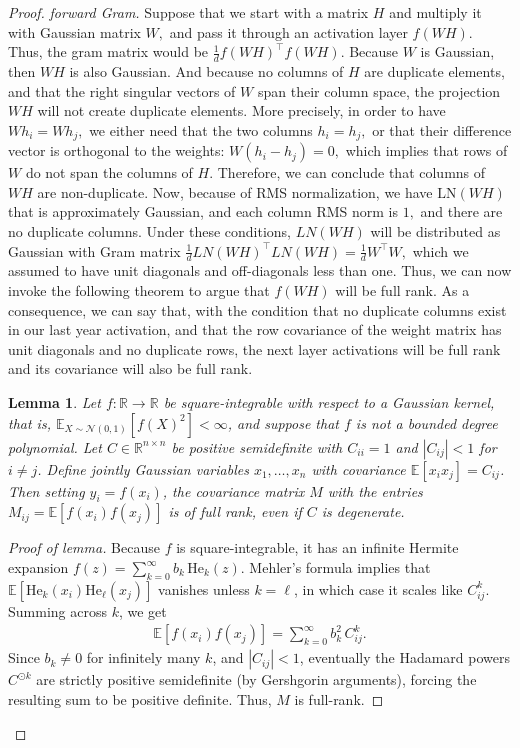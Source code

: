 \documentclass[11pt]{article}
\newcommand{\He}{\mathrm{He}}
\newtheorem{lemma}{Lemma}[section]
\begin{document}
\begin{proof}
\textit{forward Gram.} Suppose that we start with a matrix $H$ and multiply it with Gaussian matrix $W,$ and pass it through an activation layer $f( W H).$ Thus, the gram matrix would be $\frac1d f(WH)^\top f(WH).$ Because $W$ is Gaussian, then $W H$ is also Gaussian. And because no columns of $H$ are duplicate elements, and that the right singular vectors of $W$ span their column space, the projection $W H $ will not create duplicate elements. More precisely, in order to have $Wh_i = W h_j,$ we either need that the two columns $h_i= h_j,$ or that their difference vector is orthogonal to the weights: $W (h_i - h_j ) = 0,$ which implies that rows of $W$ do not span the columns of $H.$ Therefore, we can conclude that columns of $WH $ are non-duplicate. Now, because of RMS normalization, we have $\text{LN}(W H)$ that is approximately Gaussian, and each column RMS norm is $1,$ and there are no duplicate columns. Under these conditions, $LN(WH)$ will be distributed as Gaussian with Gram matrix $\frac1d LN(WH)^\top LN(WH) = \frac1d W^\top W,$ which we assumed to have unit diagonals and off-diagonals less than one. Thus, we can now invoke the following theorem to argue that $f(WH)$ will be full rank. As a consequence, we can say that, with the condition that no duplicate columns exist in our last year activation, and that the row covariance of the weight matrix has unit diagonals and no duplicate rows, the next layer activations will be full rank and its covariance will also be full rank. 

\begin{lemma}
\label{prop:RankPreservation}
Let $ f: \mathbb{R} \to \mathbb{R}$ be square-integrable with respect to a Gaussian kernel, that is, $\mathbb{E}_{X\sim \mathcal{N}(0,1)}[f(X)^2] < \infty$, and suppose that $f$ is not a bounded degree polynomial. Let $C\in \mathbb{R}^{n\times n}$ be positive semidefinite with $C_{ii}=1$ and $|C_{ij}|<1$ for $i\neq j$. Define jointly Gaussian variables $x_1,\dots,x_n$ with covariance $\mathbb{E}[x_ix_j]=C_{ij}$. Then setting $y_i = f(x_i)$, the covariance matrix $M$ with the entries $M_{ij}=\mathbb{E}[f(x_i)f(x_j)]$ is of full rank, even if $C$ is degenerate.
\end{lemma}

\begin{proof}[Proof of lemma]
Because $f$ is square-integrable, it has an infinite Hermite expansion $f(z)=\sum_{k=0}^{\infty} b_k\, \He_k(z)$. Mehler's formula implies that $\mathbb{E}[\He_k(x_i)\He_\ell(x_j)]$ vanishes unless $k=\ell$, in which case it scales like $C_{ij}^k$. Summing across $k$, we get 
\begin{align*}
\mathbb{E}[f(x_i)f(x_j)] 
= 
\sum_{k=0}^{\infty} b_k^2\,C_{ij}^k.
\end{align*}
Since $b_k\neq 0$ for infinitely many $k$, and $|C_{ij}|<1$, eventually the Hadamard powers $C^{\odot k}$ are strictly positive semidefinite (by Gershgorin arguments), forcing the resulting sum to be positive definite. Thus, $M$ is full-rank.
\end{proof}

\end{proof}
\end{document}
